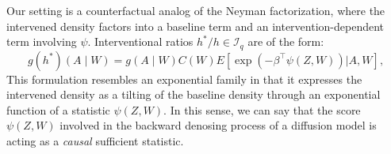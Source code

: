 \documentclass[12pt]{article}
\theoremstyle{thmstyleone}%
\theoremstyle{thmstyletwo}%
\theoremstyle{thmstylethree}%
\begin{document}
Our setting is a counterfactual analog of the Neyman factorization, where the intervened density factors into a baseline term and an intervention-dependent term involving $\psi$. Interventional ratios $ h^*/h \in \mathcal{I}_q$ are of the form:
	\[
	g(h^*)(A \mid W) = g(A \mid W) C(W)  {E}\left[ \exp\left( -\beta^\top \psi(Z, W) \right) \Big| A, W \right],
	\]
 This formulation resembles an exponential family in that it expresses the intervened density as a tilting of the baseline density through an exponential function of a statistic $\psi(Z, W)$. In this sense, we can say that the score $\psi(Z, W)$ involved in the backward denosing process of a diffusion model is acting as a \textit{causal }sufficient statistic.
		
		

		
\end{document}
